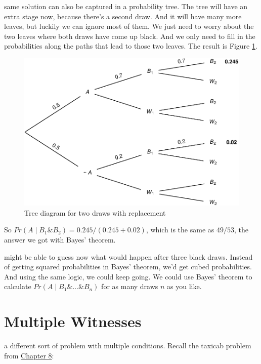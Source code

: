 \documentclass[justified]{tufte-book}
\newcommand{\given}{\mid}
\renewcommand{\wedge}{\mathbin{\&}}
\newcommand{\p}{Pr}
\theoremstyle{definition}
\theoremstyle{definition}
\theoremstyle{definition}
\theoremstyle{remark}
\begin{document}
 same solution can also be captured in a probability
tree. The tree will have an extra stage now, because there's a second
draw. And it will have many more leaves, but luckily we can ignore most
of them. We just need to worry about the two leaves where both draws
have come up black. And we only need to fill in the probabilities along
the paths that lead to those two leaves. The result is Figure
\ref{fig:twodrawsreplacement}.

\begin{figure}
\includegraphics{_main_files/figure-latex/twodrawsreplacement-1} \caption[Tree diagram for two draws with replacement]{Tree diagram for two draws with replacement}\label{fig:twodrawsreplacement}
\end{figure}

So \(\p(A \given B_1 \wedge B_2) = 0.245 / (0.245 + 0.02)\), which is
the same as \(49/53\), the answer we got with Bayes' theorem.

 might be able to guess now what would happen after
three black draws. Instead of getting squared probabilities in Bayes'
theorem, we'd get cubed probabilities. And using the same logic, we
could keep going. We could use Bayes' theorem to calculate
\(\p(A \given B_1 \wedge \ldots \wedge B_n)\) for as many draws \(n\) as
you like.

\hypertarget{multiple-witnesses}{%
\section{Multiple Witnesses}\label{multiple-witnesses}}

 a different sort of problem with multiple
conditions. Recall the taxicab problem from
\protect\hyperlink{chbayes}{Chapter 8}:
\end{document}
